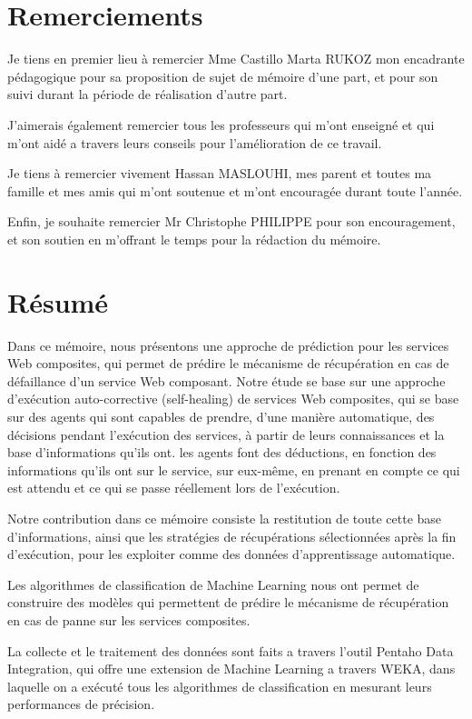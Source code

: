 \documentclass[a4paper,12pt]{book}
\theoremstyle{break}
\begin{document}
\chapter*{Remerciements}

Je tiens en premier lieu à remercier Mme Castillo Marta RUKOZ mon encadrante pédagogique pour sa proposition de sujet de mémoire d'une part, et pour son suivi durant la période de réalisation d'autre part.

J'aimerais également remercier tous les professeurs qui m'ont enseigné et qui m'ont aidé a travers leurs conseils pour l'amélioration de ce travail.

Je tiens à remercier vivement Hassan MASLOUHI, mes parent et toutes ma famille et mes amis qui m’ont soutenue et m’ont encouragée durant toute l'année.

Enfin, je souhaite remercier Mr Christophe PHILIPPE pour son encouragement, et son soutien en m'offrant le temps pour la rédaction du mémoire.



\chapter*{Résumé}

Dans ce mémoire, nous présentons une approche de prédiction pour les services Web composites,
qui permet de prédire le mécanisme de récupération en cas de défaillance d'un service Web composant.
Notre étude se base sur une approche d'exécution auto-corrective (self-healing) de services Web composites, qui se base sur des agents qui sont capables de prendre, d'une manière automatique, des décisions pendant l'exécution des services, à partir de leurs connaissances et la base d'informations qu'ils ont.
les agents font des déductions, en fonction des informations qu'ils ont sur le service, sur eux-même, en prenant en compte ce qui est attendu et ce qui se passe réellement lors de l'exécution.

Notre contribution dans ce mémoire consiste la restitution de toute cette base d'informations, ainsi que les stratégies de récupérations sélectionnées après la fin d'exécution, pour les exploiter comme des données  d'apprentissage automatique. 

Les algorithmes de classification de Machine Learning nous ont permet de construire des modèles qui permettent de prédire le mécanisme de récupération en cas de panne sur les services composites.

La collecte et le traitement des données sont faits a travers l'outil Pentaho Data Integration, qui offre une extension de Machine Learning a travers WEKA, dans laquelle on a exécuté tous les algorithmes de classification en mesurant leurs performances de précision.
\end{document}

